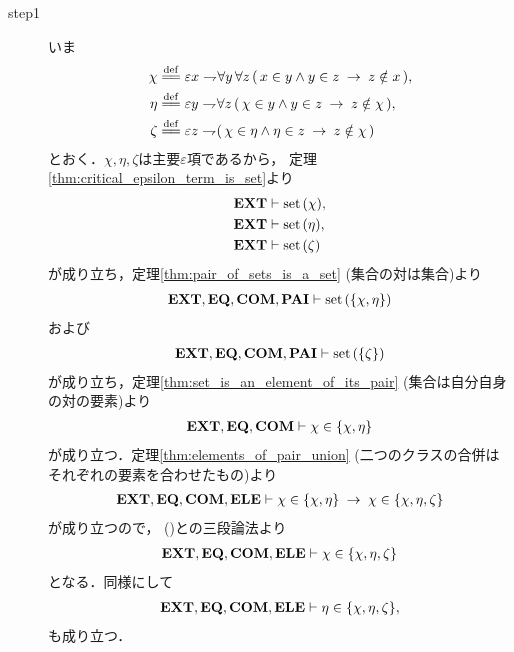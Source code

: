 	\begin{sketch}\mbox{}
		\begin{description}
			\item[step1] いま
				\begin{align}
					\chi &\defeq \varepsilon x \negation \forall y\, \forall z\, 
						(\, x \in y \wedge y \in z \rarrow z \notin x\, ), \\
					\eta &\defeq \varepsilon y \negation \forall z\, 
						(\, \chi \in y \wedge y \in z \rarrow z \notin \chi\, ), \\
					\zeta &\defeq \varepsilon z \negation 
						(\, \chi \in \eta \wedge \eta \in z 
						\rarrow z \notin \chi\, )
				\end{align}
				とおく．$\chi,\eta,\zeta$は主要$\varepsilon$項であるから，
				定理\ref{thm:critical_epsilon_term_is_set}より
				\begin{align}
					\mbox{{\bf EXT}} &\vdash \operatorname*{set}\hspace{0.15em}(\chi), 
					\label{fom:no_three_sets_go_round_1} \\
					\mbox{{\bf EXT}} &\vdash \operatorname*{set}\hspace{0.15em}(\eta), 
					\label{fom:no_three_sets_go_round_2} \\
					\mbox{{\bf EXT}} &\vdash \operatorname*{set}\hspace{0.15em}(\zeta) 
					\label{fom:no_three_sets_go_round_3}
				\end{align}
				が成り立ち，定理\ref{thm:pair_of_sets_is_a_set} (集合の対は集合)より
				\begin{align}
					\mbox{{\bf EXT}},\mbox{{\bf EQ}},\mbox{\bf COM},\mbox{{\bf PAI}} \vdash \operatorname*{set}\hspace{0.15em}(\{\chi,\eta\})
					\label{fom:no_three_sets_go_round_4}
				\end{align}
				および
				\begin{align}
					\mbox{{\bf EXT}},\mbox{{\bf EQ}},\mbox{\bf COM},\mbox{{\bf PAI}} \vdash \operatorname*{set}\hspace{0.15em}(\{\zeta\})
					\label{fom:no_three_sets_go_round_5}
				\end{align}
				が成り立ち，定理\ref{thm:set_is_an_element_of_its_pair}
				(集合は自分自身の対の要素)より
				\begin{align}
					\mbox{{\bf EXT}},\mbox{{\bf EQ}},\mbox{\bf COM} \vdash \chi \in \{\chi,\eta\}
					\label{fom:no_three_sets_go_round_6}
				\end{align}
				が成り立つ．定理\ref{thm:elements_of_pair_union}
				(二つのクラスの合併はそれぞれの要素を合わせたもの)より
				\begin{align}
					\mbox{{\bf EXT}},\mbox{{\bf EQ}},\mbox{\bf COM},\mbox{{\bf ELE}} \vdash 
					\chi \in \{\chi,\eta\} \hspace{0.25em}\rightarrow\hspace{0.25em} \chi \in \{\chi,\eta,\zeta\}
				\end{align}
				が成り立つので，%
				()との三段論法より
				\begin{align}
					\mbox{{\bf EXT}},\mbox{{\bf EQ}},\mbox{\bf COM},\mbox{{\bf ELE}} \vdash \chi \in \{\chi,\eta,\zeta\}
					\label{fom:no_three_sets_go_round_7}
				\end{align}
				となる．同様にして
				\begin{align}
					\mbox{{\bf EXT}},\mbox{{\bf EQ}},\mbox{\bf COM},\mbox{{\bf ELE}} \vdash \eta \in \{\chi,\eta,\zeta\},
					\label{fom:no_three_sets_go_round_8}
				\end{align}
				も成り立つ．
				

\end{description}
\end{sketch}
